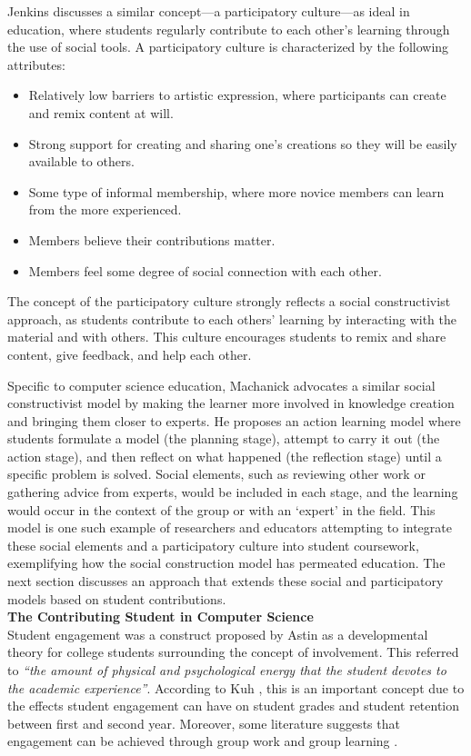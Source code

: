 Jenkins \cite{jenkins2009confronting} discusses a similar concept---a participatory culture---as ideal in education, where students regularly contribute to each other's learning through the use of social tools. A participatory culture is characterized by the following attributes:

\begin{itemize}
\item Relatively low barriers to artistic expression, where participants can create and remix content at will.
\item Strong support for creating and sharing one's creations so they will be easily available to others.
\item Some type of informal membership, where more novice members can learn from the more experienced.
\item Members believe their contributions matter.
\item Members feel some degree of social connection with each other.
\end{itemize}

The concept of the participatory culture strongly reflects a social constructivist approach, as students contribute to each others' learning by interacting with the material and with others. This culture encourages students to remix and share content, give feedback, and help each other.

Specific to computer science education, Machanick \cite{machanick2007social} advocates a similar social constructivist model by making the learner more involved in knowledge creation and bringing them closer to experts. He proposes an action learning model where students formulate a model (the planning stage), attempt to carry it out (the action stage), and then reflect on what happened (the reflection stage) until a specific problem is solved. Social elements, such as reviewing other work or gathering advice from experts, would be included in each stage, and the learning would occur in the context of the group or with an `expert' in the field. This model is one such example of researchers and educators attempting to integrate these social elements and a participatory culture into student coursework, exemplifying how the social construction model has permeated education. The next section discusses an approach that extends these social and participatory models based on student contributions. \\

\textbf{The Contributing Student in Computer Science} \\
Student engagement was a construct proposed by Astin \cite{astin1984student} as a developmental theory for college students surrounding the concept of involvement. This referred to \textit{``the amount of physical and psychological energy that the student devotes to the academic experience''}. According to Kuh \cite{kuh2001assessing}, this is an important concept due to the effects student engagement can have on student grades and student retention between first and second year. Moreover, some literature suggests that engagement can be achieved through group work and group learning \cite{bower2007groupwork}.

